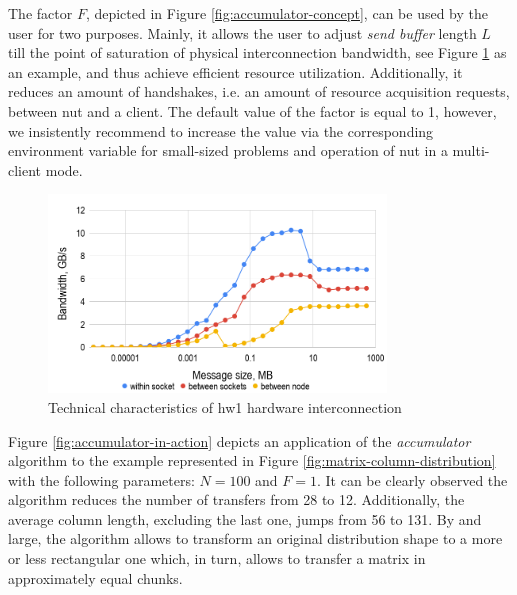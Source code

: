 The factor $F$, depicted in Figure \ref{fig:accumulator-concept}, can be used by the user for two purposes. Mainly, it allows the user to adjust  \textit{send buffer} length $L$ till the point of saturation of physical interconnection bandwidth, see Figure \ref{fig:hw1-bandwidth} as an example, and thus achieve efficient resource utilization. Additionally, it reduces an amount of handshakes, i.e. an amount of resource acquisition requests, between \acrshort{nut} and a client. The default value of the factor is equal to 1, however, we insistently recommend to increase the value via the corresponding environment variable for small-sized problems and operation of \acrshort{nut} in a multi-client mode.


\begin{figure}[!htpb]
  \centering
  \includegraphics[width=0.8\textwidth]{figures/chapter-3/hw1-bandwidth.png}
  \caption{Technical characteristics of  \gls{hw1} hardware interconnection} \label{fig:hw1-bandwidth}
\end{figure}



Figure \ref{fig:accumulator-in-action} depicts an application of the \textit{accumulator} algorithm to the example represented in Figure \ref{fig:matrix-column-distribution} with the following parameters: $N = 100$ and $F = 1$. It can be clearly observed the algorithm reduces the number of transfers from 28 to 12. Additionally, the average column length, excluding the last one, jumps from 56 to 131. By and large, the algorithm allows to transform an original distribution shape to a more or less rectangular one which, in turn, allows to transfer a matrix in approximately equal chunks.\\



